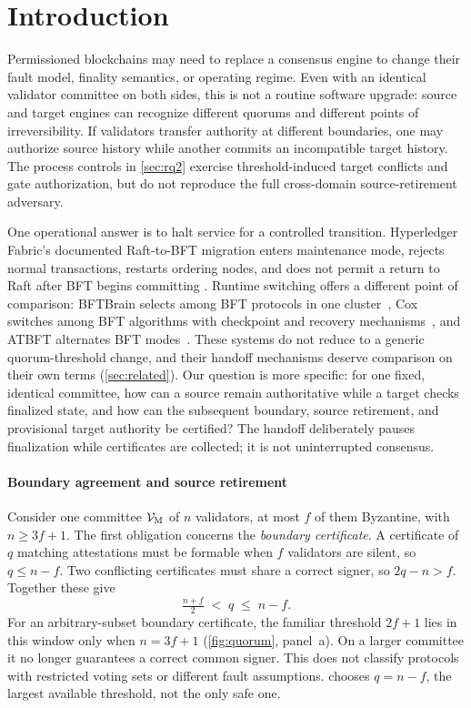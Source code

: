 \section{Introduction}
\label{sec:intro}

Permissioned blockchains may need to replace a consensus engine to change their fault model,
finality semantics, or operating regime. Even with an identical validator committee on both sides,
this is not a routine software upgrade: source and target engines can recognize different quorums
and different points of irreversibility. If validators transfer authority at different boundaries,
one may authorize source history while another commits an incompatible target history. The
process controls in \cref{sec:rq2} exercise threshold-induced target conflicts and gate
authorization, but do not reproduce the full cross-domain source-retirement adversary.

One operational answer is to halt service for a controlled transition. Hyperledger Fabric's
documented Raft-to-BFT migration enters maintenance mode, rejects normal transactions, restarts
ordering nodes, and does not permit a return to Raft after BFT begins committing
\cite{fabric,fabricbftmigration}. Runtime switching offers a different point of comparison:
BFTBrain selects among BFT protocols in one cluster~\cite{bftbrain}, Cox switches among BFT
algorithms with checkpoint and recovery mechanisms~\cite{cox}, and ATBFT alternates BFT
modes~\cite{atbft}. These systems do not reduce to a generic quorum-threshold change, and their
handoff mechanisms deserve comparison on their own terms (\cref{sec:related}). Our question is
more specific: for one fixed, identical committee, how can a source remain authoritative while a
target checks finalized state, and how can the subsequent boundary, source retirement, and
provisional target authority be certified? The handoff deliberately pauses finalization while
certificates are collected; it is not uninterrupted consensus.

\paragraph{Boundary agreement and source retirement}
Consider one committee $\mathcal{V}_{\mathrm M}$ of $n$ validators, at most $f$ of them Byzantine, with $n\ge 3f+1$. The
first obligation concerns the \emph{boundary certificate}. A certificate of $q$ matching attestations
must be formable when $f$ validators are silent, so $q\le n-f$. Two conflicting certificates must
share a correct signer, so $2q-n>f$. Together these give
\begin{equation}
  \tfrac{n+f}{2} \;<\; q \;\le\; n-f .
  \label{eq:intro-window}
\end{equation}
For an arbitrary-subset boundary certificate, the familiar threshold $2f+1$ lies in this window
only when $n=3f+1$ (\cref{fig:quorum}, panel~a). On a larger committee it no longer guarantees a
correct common signer. This does not classify protocols with restricted voting sets or different
fault assumptions. \sage{} chooses $q=n-f$, the largest available threshold, not the only safe one.

